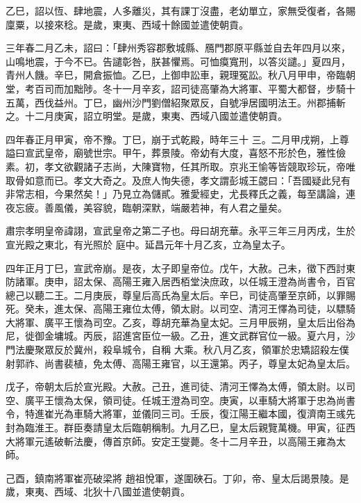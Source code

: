 \begin{pinyinscope}
 乙巳，詔以恆、肆地震，人多離災，其有課丁沒盡，老幼單立，家無受復者，各賜廩粟，以接來稔。是歲，東夷、西域十餘國並遣使朝貢。



 三年春二月乙未，詔曰：「肆州秀容郡敷城縣、鴈門郡原平縣並自去年四月以來，山鳴地震，于今不已。告譴彰咎，朕甚懼焉。可恤瘼寬刑，以答災譴。」夏四月，青州人饑。辛巳，開倉振恤。乙巳，上御申訟車，親理冤訟。秋八月甲申，帝臨朝堂，考百司而加黜陟。冬十一月辛亥，詔司徒高肇為大將軍、平蜀大都督，步騎十五萬，西伐益州。丁巳，幽州沙門劉僧紹聚眾反，自號凈居國明法王。州郡捕斬之。十二月庚寅，詔立明堂。是歲，東夷、西域八國並遣使朝貢。



 四年春正月甲寅，帝不豫。丁巳，崩于式乾殿，時年三十
 三。二月甲戌朔，上尊謚曰宣武皇帝，廟號世宗。甲午，葬景陵。帝幼有大度，喜怒不形於色，雅性儉素。初，孝文欲觀諸子志尚，大陳寶物，任其所取。京兆王愉等皆競取珍玩，帝唯取骨如意而已。孝文大奇之。及庶人恂失德，孝文謂彭城王勰曰：「吾國疑此兒有非常志相，今果然矣！」乃見立為儲貳。雅愛經史，尤長釋氏之義，每至講論，連夜忘疲。善風儀，美容貌，臨朝深默，端嚴若神，有人君之量矣。



 肅宗孝明皇帝諱詡，宣武皇帝之第二子也。母曰胡充華。永平三年三月丙戌，生於宣光殿之東北，有光照於
 庭中。延昌元年十月乙亥，立為皇太子。



 四年正月丁巳，宣武帝崩。是夜，太子即皇帝位。戊午，大赦。己未，徵下西討東防諸軍。庚申，詔太保、高陽王雍入居西栢堂決庶政，以任城王澄為尚書令，百官總己以聽二王。二月庚辰，尊皇后高氏為皇太后。辛巳，司徒高肇至京師，以罪賜死。癸未，進太保、高陽王雍位太傅，領太尉。以司空、清河王懌為司徒，以驃騎大將軍、廣平王懷為司空。乙亥，尊胡充華為皇太妃。三月甲辰朔，皇太后出俗為尼，徙御金墉城。丙辰，詔進宮臣位一級。乙丑，進文武群官位一級。夏六月，沙門法慶聚眾反於冀州，殺阜城令，自稱
 大乘。秋八月乙亥，領軍於忠矯詔殺左僕射郭祚、尚書裴植，免太傅、高陽王雍官，以王還第。丙子，尊皇太妃為皇太后。



 戊子，帝朝太后於宣光殿。大赦。己丑，進司徒、清河王懌為太傅，領太尉。以司空、廣平王懷為太保，領司徒。任城王澄為司空。庚寅，以車騎大將軍于忠為尚書令，特進崔光為車騎大將軍，並儀同三司。壬辰，復江陽王繼本國，復濟南王彧先封為臨淮王。群臣奏請皇太后臨朝稱制。九月乙巳，皇太后親覽萬機。甲寅，征西大將軍元遙破斬法慶，傳首京師。安定王燮薨。冬十二月辛丑，以高陽王雍為太師。



 己酉，鎮南將軍崔亮破梁將
 趙祖悅軍，遂圍硤石。丁卯，帝、皇太后謁景陵。是歲，東夷、西域、北狄十八國並遣使朝貢。




\end{pinyinscope}
